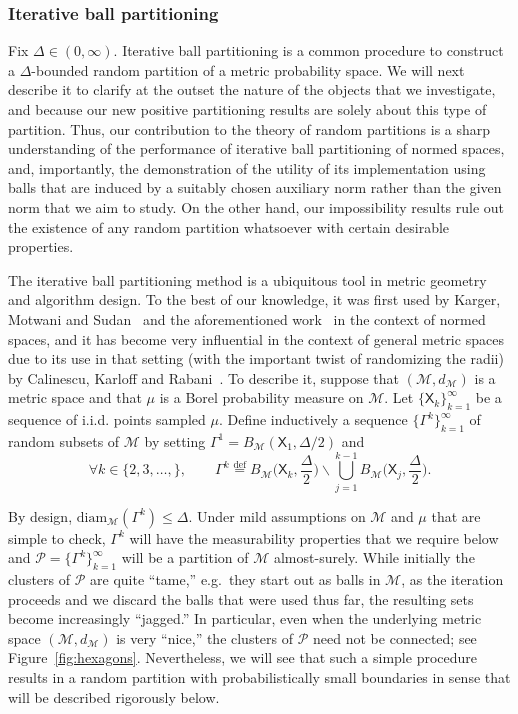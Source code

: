 \documentclass[11pt,reqno]{amsart}
\renewcommand{\le}{\leqslant}
\renewcommand{\setminus}{\smallsetminus}
\newcommand{\diam}{\mathrm{diam}}
\theoremstyle{remark}
\newcommand{\MM}{\mathcal{M}}
\newcommand{\eqdef}{\stackrel{\mathrm{def}}{=}}
\renewcommand{\1}{\mathbf 1}
\newcommand{\Part}{\mathscr{P}}
\newcommand{\XX}{\mathsf{X}}
\begin{document}
\subsubsection{Iterative ball partitioning}\label{sec:iterated balls} Fix $\Delta\in (0,\infty)$. {Iterative ball partitioning} is a common procedure to construct a $\Delta$-bounded random partition of a metric probability space.  We will next describe it to clarify at the outset the nature of the objects that we investigate, and because our new positive partitioning results  are solely about this  type of partition.  Thus,  our contribution to the theory of random partitions  is a sharp understanding of the performance of iterative ball partitioning of normed spaces, and, importantly, the demonstration of the utility of its implementation using balls that are induced by a suitably chosen auxiliary norm rather than the given norm  that we aim to study. On the other hand, our impossibility results rule out the existence of any random partition whatsoever with certain desirable properties.



The iterative ball partitioning method is a ubiquitous tool in metric geometry and algorithm design.  To the best of our knowledge, it was first used by Karger, Motwani and Sudan~\cite{KMS98} and the aforementioned work~\cite{CCGGP98} in the context of normed spaces, and it has become very influential in the context of general metric spaces due to its use in that setting (with the important twist of randomizing the radii) by Calinescu, Karloff and Rabani~\cite{CKR04}. To describe it, suppose that $(\MM,d_\MM)$ is a  metric space and that $\mu$ is a Borel probability measure on $\MM$. Let $\{\XX_k\}_{k=1}^\infty$ be a sequence of i.i.d. points sampled $\mu$. Define inductively a sequence $\{\Gamma^k\}_{k=1}^\infty$ of random subsets of $\MM$ by setting $\Gamma^1=B_\MM(\XX_1,\Delta/2)$ and
$$
\forall k\in \{2,3,\ldots,\},\qquad \Gamma^k\eqdef B_\MM\Big(\XX_k,\frac{\Delta}{2}\Big)\setminus \bigcup_{j=1}^{k-1} B_\MM\Big(\XX_j,\frac{\Delta}{2}\Big).
$$

By design, $\diam_\MM(\Gamma^k)\le \Delta$. Under mild assumptions on $\MM$ and $\mu$ that are simple to check, $\Gamma^k$ will have the measurability properties that we require below and  $\Part=\{\Gamma^k\}_{k=1}^\infty$ will be a partition of $\MM$ almost-surely. While initially the clusters of  $\Part$ are quite ``tame,'' e.g.~they start out as balls in $\MM$, as the iteration proceeds and we discard the balls that were used thus far, the resulting sets become increasingly ``jagged.'' In particular, even when the underlying metric space $(\MM,d_\MM)$ is very ``nice,'' the clusters of $\Part$ need not be connected; see Figure~\ref{fig:hexagons}. Nevertheless, we will see that such a simple procedure results in a random partition with probabilistically small boundaries in  sense that will be described rigorously below.
\end{document}
